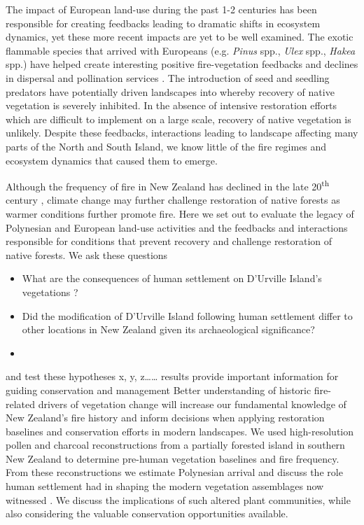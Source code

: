 \documentclass{article}
\begin{document}
The impact of European land-use during the past 1-2 centuries has been responsible for creating feedbacks leading to dramatic shifts in ecosystem dynamics, yet these more recent impacts are yet to be well examined.  The exotic flammable species that arrived with Europeans (e.g. \textit {Pinus} spp., \textit {Ulex} spp., \textit {Hakea} spp.) have helped create interesting positive fire-vegetation feedbacks \citep{Perry2014} and declines in dispersal and pollination services \citep{kitzberger2016fire,keeley2011fire}.  The introduction of seed and seedling predators \citep{perry2015exotic,sullivan2010feathers} have potentially driven landscapes into  whereby recovery of native vegetation is severely inhibited. In the absence of intensive restoration efforts which are difficult to implement on a large scale, recovery of native vegetation is unlikely. Despite these feedbacks, interactions leading to landscape  affecting  many parts of the North and South Island, we know little of the fire regimes and ecosystem dynamics that caused them to emerge.

Although the frequency of fire in New Zealand has declined in the late 20\textsuperscript{th} century \citep{Perry2014,anderson2008wildfires}, climate change may further challenge restoration of native forests \citep{Harris2006, Zavaleta2009,mcglone2011potential} as warmer conditions further promote fire.  Here we set out to evaluate the legacy of Polynesian and European land-use activities and the feedbacks and interactions responsible for conditions that prevent recovery and challenge restoration of native forests. We ask these questions \begin{itemize}
	\item What are the consequences of human settlement on D'Urville Island's vegetations ?
	\item Did the modification of D'Urville Island following human settlement differ to other locations in New Zealand given its archaeological significance?  
	
	\item 
\end{itemize}
and test these hypotheses x, y, z…… results provide important information for  guiding conservation and management  Better understanding of historic fire-related drivers of vegetation change will increase our fundamental knowledge of New Zealand's fire history and inform decisions when applying restoration baselines and conservation efforts in modern landscapes.  We used high-resolution pollen and charcoal reconstructions from a partially forested island in southern New Zealand to determine pre-human vegetation baselines and fire frequency. From these reconstructions we estimate Polynesian arrival and discuss the role human settlement had in shaping the modern vegetation assemblages now witnessed . We discuss the implications of such altered plant communities, while also considering the valuable conservation opportunities available.
	
\end{document}
